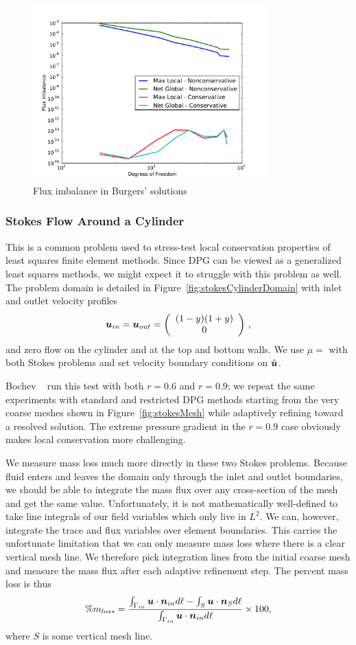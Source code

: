 \documentclass[Proposal.tex]{subfiles}
\begin{document}
\begin{figure}[p]
\centering
\includegraphics[width=0.8\textwidth]{figs/Burgers/graphFlux.pdf}
\caption{Flux imbalance in Burgers' solutions}
\label{fig:burgers_flux}
\end{figure}

\subsubsection{Stokes Flow Around a Cylinder}\label{sec:stokesCylinder}
This is a common problem used to stress-test local conservation properties of
least squares finite element methods. Since DPG can be viewed as a generalized
least squares methods\cite{DPGOverview}, we might expect it to struggle with
this problem as well. The problem domain is detailed in
Figure~\ref{fig:stokesCylinderDomain} with inlet and outlet velocity profiles
\[
\boldsymbol u_{in}=\boldsymbol u_{out}=\left( \begin{array}{c} (1-y)(1+y)\\ 0\\ \end{array} \right)\,,
\]
and zero flow on the cylinder and at the top and bottom walls. We use $\mu=$
with both Stokes problems and set velocity boundary conditions on $\hat{\boldsymbol u}$.

Bochev \etal~\cite{Bochev2010} run this test with both $r=0.6$ and $r=0.9$; we
repeat the same experiments with standard and restricted DPG methods
starting from the very coarse meshes shown in Figure~\ref{fig:stokesMesh}
while adaptively refining toward a resolved solution. The extreme pressure
gradient in the $r=0.9$ case obviously makes local conservation more
challenging.

We measure mass loss much more directly in these two Stokes problems. Because
fluid enters and leaves the domain only through the inlet and outlet
boundaries, we should be able to integrate the mass flux over any
cross-section of the mesh and get the same value. Unfortunately, it is not
mathematically well-defined to take line integrals of our field variables which only
live in $L^2$. We can, however, integrate the trace and flux variables over element boundaries.
This carries the unfortunate limitation that we can only measure mass loss
where there is a clear vertical mesh line. We therefore pick integration lines
from the initial coarse mesh and measure the mass flux after each adaptive refinement
step. The percent mass loss is thus
\[
\%m_{loss}=\frac{\int_{\Gamma_{in}}\boldsymbol u\cdot\boldsymbol n_{in}d\ell-\int_S\boldsymbol u\cdot\boldsymbol n_Sd\ell}
{\int_{\Gamma_{in}}\boldsymbol u\cdot\boldsymbol n_{in}d\ell}\times100,
\]
where $S$ is some vertical mesh line.
\end{document}
